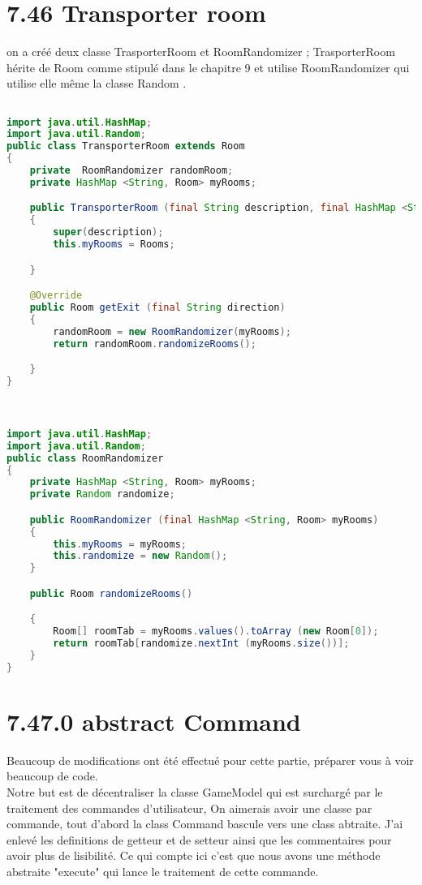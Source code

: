 \documentclass[a4paper , 10pt]{article}
\begin{document}
\section{7.46 Transporter room }
on a créé deux classe TrasporterRoom et RoomRandomizer ; TrasporterRoom hérite de Room comme stipulé dans le chapitre 9 et utilise RoomRandomizer qui utilise elle même la classe Random .
\begin{lstlisting}[language=Java]

import java.util.HashMap;
import java.util.Random;
public class TransporterRoom extends Room
{
    private  RoomRandomizer randomRoom;
    private HashMap <String, Room> myRooms;

    public TransporterRoom (final String description, final HashMap <String, Room> Rooms)
    {
        super(description);
        this.myRooms = Rooms;

    }

    @Override
    public Room getExit (final String direction)
    {
        randomRoom = new RoomRandomizer(myRooms);
        return randomRoom.randomizeRooms();

    }
}



import java.util.HashMap;
import java.util.Random;
public class RoomRandomizer
{
    private HashMap <String, Room> myRooms;
    private Random randomize;

    public RoomRandomizer (final HashMap <String, Room> myRooms)
    {
        this.myRooms = myRooms;
        this.randomize = new Random();
    }

    public Room randomizeRooms()

    {
        Room[] roomTab = myRooms.values().toArray (new Room[0]);
        return roomTab[randomize.nextInt (myRooms.size())];
    }
}
\end{lstlisting}

\section{7.47.0 abstract Command }
Beaucoup de modifications ont été effectué pour cette partie, préparer vous à voir beaucoup de code.\\
Notre but est de décentraliser la classe GameModel qui est surchargé par le traitement des commandes d'utilisateur, 
On aimerais avoir une classe par commande, tout d'abord la class Command bascule vers une class abtraite.
J'ai enlevé les definitions de getteur et de setteur ainsi que les commentaires pour avoir plus de lisibilité.
Ce qui compte ici c'est que nous avons une méthode abstraite "execute" qui lance le traitement de cette commande. 
\end{document}
